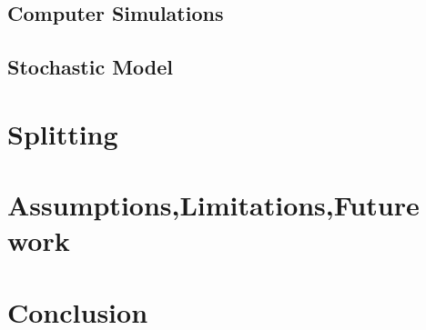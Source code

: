 \documentclass[12pt]{article}
\begin{document}
\subsection{Computer Simulations}
\subsection{Stochastic Model} %
\section{Splitting}

\section{Assumptions,Limitations,Future work}

\section{Conclusion}

\end{document}
